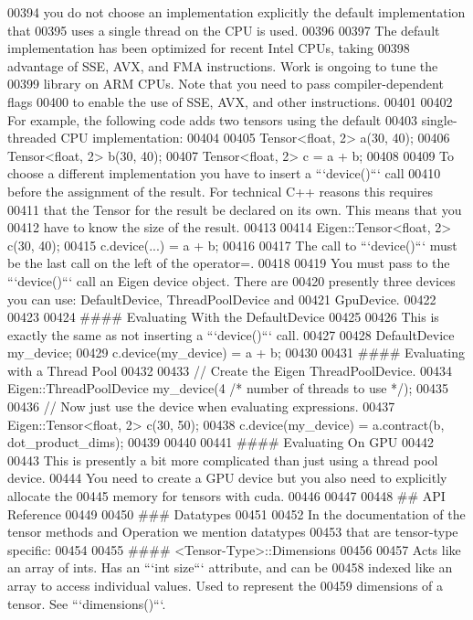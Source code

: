 \begin{DoxyCode}
00394 you do not choose an implementation explicitly the default implementation that
00395 uses a single thread on the CPU is used.
00396 
00397 The default implementation has been optimized for recent Intel CPUs, taking
00398 advantage of SSE, AVX, and FMA instructions.  Work is ongoing to tune the
00399 library on ARM CPUs.  Note that you need to pass compiler-dependent flags
00400 to enable the use of SSE, AVX, and other instructions.
00401 
00402 For example, the following code adds two tensors using the default
00403 single-threaded CPU implementation:
00404 
00405     Tensor<float, 2> a(30, 40);
00406     Tensor<float, 2> b(30, 40);
00407     Tensor<float, 2> c = a + b;
00408 
00409 To choose a different implementation you have to insert a ```device()``` call
00410 before the assignment of the result.  For technical C++ reasons this requires
00411 that the Tensor for the result be declared on its own.  This means that you
00412 have to know the size of the result.
00413 
00414     Eigen::Tensor<float, 2> c(30, 40);
00415     c.device(...) = a + b;
00416 
00417 The call to ```device()``` must be the last call on the left of the operator=.
00418 
00419 You must pass to the ```device()``` call an Eigen device object.  There are
00420 presently three devices you can use: DefaultDevice, ThreadPoolDevice and
00421 GpuDevice.
00422 
00423 
00424 #### Evaluating With the DefaultDevice
00425 
00426 This is exactly the same as not inserting a ```device()``` call.
00427 
00428     DefaultDevice my\_device;
00429     c.device(my\_device) = a + b;
00430 
00431 #### Evaluating with a Thread Pool
00432 
00433     // Create the Eigen ThreadPoolDevice.
00434     Eigen::ThreadPoolDevice my\_device(4 /* number of threads to use */);
00435 
00436     // Now just use the device when evaluating expressions.
00437     Eigen::Tensor<float, 2> c(30, 50);
00438     c.device(my\_device) = a.contract(b, dot\_product\_dims);
00439 
00440 
00441 #### Evaluating On GPU
00442 
00443 This is presently a bit more complicated than just using a thread pool device.
00444 You need to create a GPU device but you also need to explicitly allocate the
00445 memory for tensors with cuda.
00446 
00447 
00448 ## API Reference
00449 
00450 ### Datatypes
00451 
00452 In the documentation of the tensor methods and Operation we mention datatypes
00453 that are tensor-type specific:
00454 
00455 #### <Tensor-Type>::Dimensions
00456 
00457 Acts like an array of ints.  Has an ```int size``` attribute, and can be
00458 indexed like an array to access individual values.  Used to represent the
00459 dimensions of a tensor.  See ```dimensions()```.

\end{DoxyCode}
